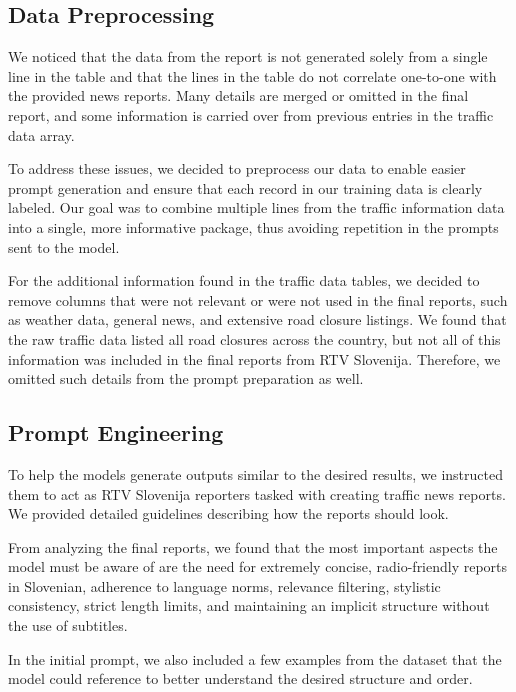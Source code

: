 \documentclass[fleqn,moreauthors,10pt]{ds_report}
\begin{document}
\subsection*{Data Preprocessing}

We noticed that the data from the report is not generated solely from a single line in the table and that the lines in the table do not correlate one-to-one with the provided news reports. Many details are merged or omitted in the final report, and some information is carried over from previous entries in the traffic data array.

To address these issues, we decided to preprocess our data to enable easier prompt generation and ensure that each record in our training data is clearly labeled. Our goal was to combine multiple lines from the traffic information data into a single, more informative package, thus avoiding repetition in the prompts sent to the model.

For the additional information found in the traffic data tables, we decided to remove columns that were not relevant or were not used in the final reports, such as weather data, general news, and extensive road closure listings. We found that the raw traffic data listed all road closures across the country, but not all of this information was included in the final reports from RTV Slovenija. Therefore, we omitted such details from the prompt preparation as well.



\subsection*{Prompt Engineering}

To help the models generate outputs similar to the desired results, we instructed them to act as RTV Slovenija reporters tasked with creating traffic news reports. We provided detailed guidelines describing how the reports should look. 

From analyzing the final reports, we found that the most important aspects the model must be aware of are the need for extremely concise, radio-friendly reports in Slovenian, adherence to language norms, relevance filtering, stylistic consistency, strict length limits, and maintaining an implicit structure without the use of subtitles.

In the initial prompt, we also included a few examples from the dataset that the model could reference to better understand the desired structure and order.
\end{document}
